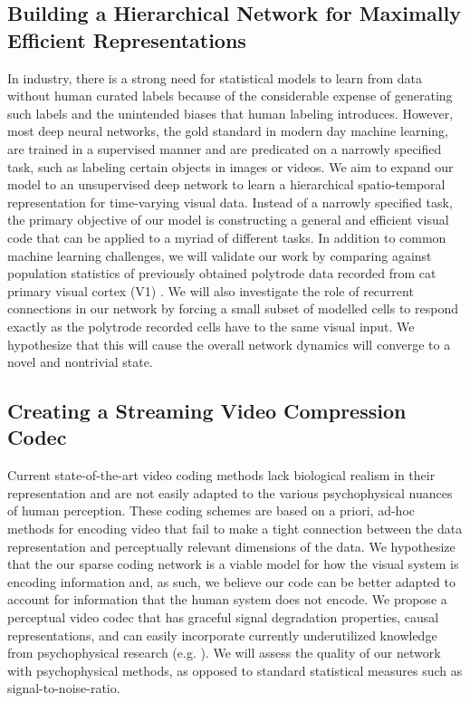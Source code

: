 \documentclass[smallextended]{svjour3}       %
\begin{document}
\subsection{Building a Hierarchical Network for Maximally Efficient Representations} \label{aim2}
\noindent In industry, there is a strong need for statistical models to learn from data without human curated labels because of the considerable expense of generating such labels and the unintended biases that human labeling introduces. However, most deep neural networks, the gold standard in modern day machine learning, are trained in a supervised manner and are predicated on a narrowly specified task, such as labeling certain objects in images or videos. We aim to expand our model to an unsupervised deep network to learn a hierarchical spatio-temporal representation for time-varying visual data. Instead of a narrowly specified task, the primary objective of our model is constructing a general and efficient visual code that can be applied to a myriad of different tasks. In addition to common machine learning challenges, we will validate our work by comparing against population statistics of previously obtained polytrode data recorded from cat primary visual cortex (V1) \cite{zhu2015sparse}. We will also investigate the role of recurrent connections in our network by forcing a small subset of modelled cells to respond exactly as the polytrode recorded cells have to the same visual input. We hypothesize that this will cause the overall network dynamics will converge to a novel and nontrivial state.

\subsection{Creating a Streaming Video Compression Codec} \label{aim3}
\noindent Current state-of-the-art video coding methods lack biological realism in their representation and are not easily adapted to the various psychophysical nuances of human perception. These coding schemes are based on a priori, ad-hoc methods for encoding video that fail to make a tight connection between the data representation and perceptually relevant dimensions of the data. We hypothesize that the our sparse coding network is a viable model for how the visual system is encoding information and, as such, we believe our code can be better adapted to account for information that the human system does not encode. We propose a perceptual video codec that has graceful signal degradation properties, causal representations, and can easily incorporate currently underutilized knowledge from psychophysical research (e.g. \cite{takeuchi2005sharpening,takeuchi2002motion}). We will assess the quality of our network with psychophysical methods, as opposed to standard statistical measures such as signal-to-noise-ratio.
\end{document}
